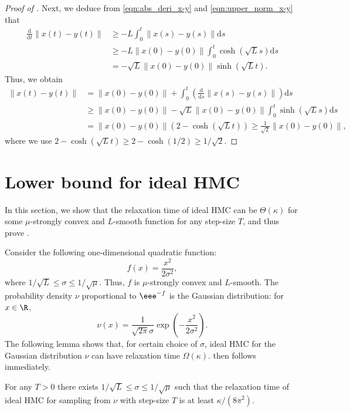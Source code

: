 \documentclass{toc}
\newcommand{\dif}{\mathrm{d}}
\newcommand{\norm}[1]{\left\lVert #1 \right\rVert}
\begin{document}
\begin{proof}[Proof of ]
	Next, we deduce from \eqref{eqn:abs_deri_x-y} and \eqref{eqn:upper_norm_x-y} that
	\begin{align*}
		\frac{\dif}{\dif t} \norm{x(t)-y(t)} 
		&\ge - L \int_{0}^t \norm{x(s)-y(s)} \dif s\\ 
		&\ge - L \norm{x(0) - y(0)} \int_{0}^t  \cosh\left( \sqrt{L}s \right) \dif s\\ 
		&= - \sqrt{L} \norm{x(0) - y(0)} \sinh\left( \sqrt{L} t \right).
	\end{align*}
	Thus, we obtain
	\begin{align*}
		\norm{x(t)-y(t)} &= \norm{x(0) - y(0)} + \int_{0}^t \left( \frac{\dif}{\dif s} \norm{x(s)-y(s)} \right) \dif s\\ 
		&\ge \norm{x(0) - y(0)} - \sqrt{L} \norm{x(0) - y(0)} \int_{0}^t \sinh\left( \sqrt{L} s \right) \dif s\\
		&= \norm{x(0) - y(0)} \left( 2 - \cosh\left( \sqrt{L} t \right) \right) \ge \frac{1}{\sqrt{2}} \norm{x(0) - y(0)},
	\end{align*}
	where we use $2 - \cosh(\sqrt{L} t) \ge 2- \cosh(1/2) \ge 1/\sqrt{2}$.
\end{proof}



\section{Lower bound for ideal HMC}
In this section, we show that the relaxation time of ideal HMC can be $\Theta(\kappa)$ for some $\mu$-strongly convex and $L$-smooth function for any step-size $T$, and thus prove . 

Consider the following one-dimensional quadratic function:
\begin{equation}
%
f(x) = \frac{x^2}{2 \sigma^2},
\end{equation}
where $1/\sqrt{L} \le \sigma \le 1/\sqrt{\mu}$. 
Thus, $f$ is $\mu$-strongly convex and $L$-smooth. The probability density $\nu$ proportional to $\eee^{-f}$ is the Gaussian distribution: for $x\in \R$, 
\begin{equation}
%
\nu(x) = \frac{1}{\sqrt{2\pi} \sigma} \exp\left( - \frac{x^2}{2\sigma^2} \right).
\end{equation}
The following lemma shows that, for certain choice of $\sigma$,
ideal HMC for the Gaussian distribution $\nu$ can have relaxation time $\Omega(\kappa)$. 
 then follows immediately.


\begin{lemma}
	For any $T > 0$ there exists $1/\sqrt{L} \le \sigma \le 1/\sqrt{\mu}$ such that the relaxation time of ideal HMC for sampling from $\nu$ with step-size $T$ is at least $\kappa/(8\pi^2)$.
\end{lemma}
%
\end{document}
